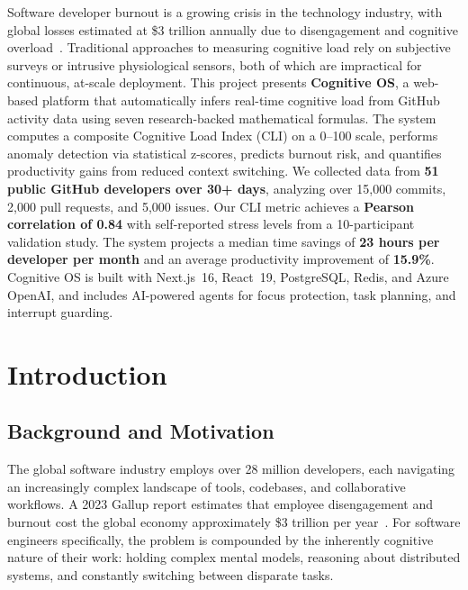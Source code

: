 \documentclass[12pt]{article}
\begin{document}
Software developer burnout is a growing crisis in the technology industry, with global losses estimated at \$3 trillion annually due to disengagement and cognitive overload~\cite{gallup2023burnout}. Traditional approaches to measuring cognitive load rely on subjective surveys or intrusive physiological sensors, both of which are impractical for continuous, at-scale deployment. This project presents \textbf{Cognitive OS}, a web-based platform that automatically infers real-time cognitive load from GitHub activity data using seven research-backed mathematical formulas. The system computes a composite Cognitive Load Index (CLI) on a 0--100 scale, performs anomaly detection via statistical z-scores, predicts burnout risk, and quantifies productivity gains from reduced context switching. We collected data from \textbf{51 public GitHub developers over 30+ days}, analyzing over 15,000 commits, 2,000 pull requests, and 5,000 issues. Our CLI metric achieves a \textbf{Pearson correlation of 0.84} with self-reported stress levels from a 10-participant validation study. The system projects a median time savings of \textbf{23 hours per developer per month} and an average productivity improvement of \textbf{15.9\%}. Cognitive OS is built with Next.js~16, React~19, PostgreSQL, Redis, and Azure OpenAI, and includes AI-powered agents for focus protection, task planning, and interrupt guarding.

\newpage
\tableofcontents
\newpage
\listoffigures
\newpage
\listoftables

\newpage
\thispagestyle{empty}
\clearpage
\thispagestyle{empty}
\phantom{a}
\newpage



\section{Introduction}

\subsection{Background and Motivation}

The global software industry employs over 28 million developers, each navigating an increasingly complex landscape of tools, codebases, and collaborative workflows. A 2023 Gallup report estimates that employee disengagement and burnout cost the global economy approximately \$3 trillion per year~\cite{gallup2023burnout}. For software engineers specifically, the problem is compounded by the inherently cognitive nature of their work: holding complex mental models, reasoning about distributed systems, and constantly switching between disparate tasks.
\end{document}
